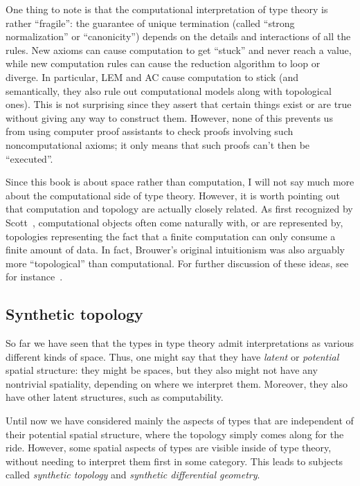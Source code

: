\documentclass[10pt]{article}
\numberwithin{equation}{section}
\begin{document}
One thing to note is that the computational interpretation of type theory is rather ``fragile'': the guarantee of unique termination (called ``strong normalization'' or ``canonicity'') depends on the details and interactions of all the rules.
New axioms can cause computation to get ``stuck'' and never reach a value, while new computation rules can cause the reduction algorithm to loop or diverge.
In particular, LEM and AC cause computation to stick (and semantically, they also rule out computational models along with topological ones).
This is not surprising since they assert that certain things exist or are true without giving any way to construct them.
However, none of this prevents us from using computer proof assistants to check proofs involving such noncomputational axioms; it only means that such proofs can't then be ``executed''.

Since this book is about space rather than computation, I will not say much more about the computational side of type theory.
However, it is worth pointing out that computation and topology are actually closely related.
As first recognized by Scott~\cite{scott:cts-lattices,scott:dt-lat,scott:ttalt}, computational objects often come naturally with, or are represented by, topologies representing the fact that a finite computation can only consume a finite amount of data.
In fact, Brouwer's original intuitionism was also arguably more ``topological'' than computational.
For further discussion of these ideas, see for instance~\cite{escardo:syntop-datatypes,vickers:topology-via-logic}.


\subsection{Synthetic topology}
\label{sec:synthetic-topology-1}

So far we have seen that the types in type theory admit interpretations as various different kinds of space.
Thus, one might say that they have \emph{latent} or \emph{potential} spatial structure: they {might} be spaces, but they also might not have any nontrivial spatiality, depending on where we interpret them.
Moreover, they also have other latent structures, such as computability.

Until now we have considered mainly the aspects of types that are {independent} of their potential spatial structure, where the topology simply comes along for the ride.
However, some spatial aspects of types are visible {inside} of type theory, without needing to interpret them first in some category.
This leads to subjects called \emph{synthetic topology} and \emph{synthetic differential geometry}.%
\end{document}
